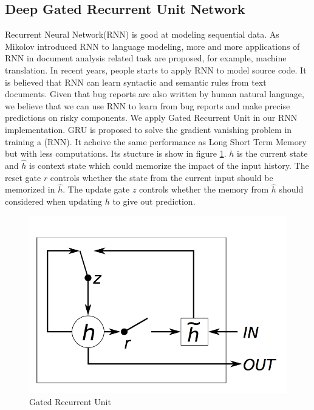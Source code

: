 \subsection{Deep Gated Recurrent Unit Network}
Recurrent Neural Network(RNN) is good at modeling sequential data. 
As Mikolov introduced RNN to language modeling\cite{mikolov2010recurrent}, more and more applications of RNN in document analysis related task are proposed, for example, machine translation. 
In recent years, people starts to apply RNN to model source code\cite{raychev2014code}. 
It is believed that RNN can learn syntactic and semantic rules from text documents.
Given that bug reports are also written by human natural language, we believe that we can use RNN to learn from bug reports and make precise predictions on risky components.
We apply Gated Recurrent Unit in our RNN implementation.
GRU is proposed to solve the gradient vanishing problem in training a (RNN)\cite{chung2014empirical}.
It acheive the same performance as Long Short Term Memory but with less computations.
Its stucture is show in figure \ref{gru}. $h$ is the current state and $\hat{h}$ is context state which could memorize the impact of the input history. 
The reset gate $r$ controls whether the state from the current input should be memorized in $\hat{h}$.
The update gate $z$ controls whether the memory from $\hat{h}$ should considered when updating $h$ to give out prediction.  
\begin{figure}
	\includegraphics[scale=0.5]{gru.png}
	\caption{Gated Recurrent Unit\cite{chung2014empirical}}
	\label{gru}
\end{figure}

